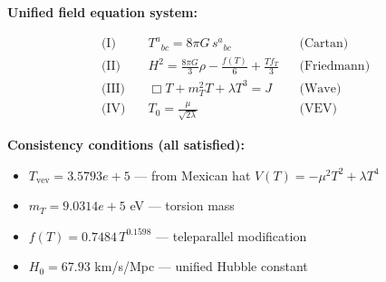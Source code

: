 
\textbf{Unified field equation system:}

\begin{align}
  \text{(I)} \quad & T^a{}_{bc} = 8\pi G \, s^a{}_{bc} && \text{(Cartan)} \\
  \text{(II)} \quad & H^2 = \frac{8\pi G}{3}\rho - \frac{f(T)}{6} + \frac{Tf_T}{3} && \text{(Friedmann)} \\
  \text{(III)} \quad & \Box T + m_T^2 T + \lambda T^3 = J && \text{(Wave)} \\
  \text{(IV)} \quad & T_0 = \frac{\mu}{\sqrt{2\lambda}} && \text{(VEV)}
\end{align}

\textbf{Consistency conditions (all satisfied):}
\begin{itemize}
  \item $T_{\text{vev}} = 3.5793e+5$ — from Mexican hat $V(T) = -\mu^2 T^2 + \lambda T^4$
  \item $m_T = 9.0314e+5$ eV — torsion mass
  \item $f(T) = 0.7484 \, T^{0.1598}$ — teleparallel modification
  \item $H_0 = 67.93$ km/s/Mpc — unified Hubble constant
\end{itemize}